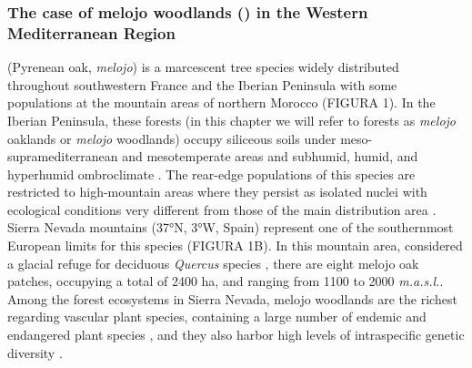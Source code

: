 \subsubsection{The case of melojo woodlands (\Qpy) in the Western Mediterranean Region}\label{sec:es:intro-qp}
\Qpw (Pyrenean oak, \emph{melojo}) is a marcescent tree species widely distributed throughout southwestern France and the Iberian Peninsula with some populations at the mountain areas of northern Morocco \autocites{Franco1990Quercus} (FIGURA 1). In the Iberian Peninsula, these forests (in this chapter we will refer to \Qpy forests as \emph{melojo} oaklands or \emph{melojo} woodlands) occupy siliceous soils under meso-supramediterranean and mesotemperate areas and subhumid, humid, and hyperhumid ombroclimate \autocites{delaSernaetal2016MarcescentQuercus,Gavilanetal2018SclerophyllousDeciduous}. The rear-edge populations of this species are restricted to high-mountain areas where they persist as isolated nuclei with ecological conditions very different from those of the main distribution area \autocites{PerezLuqueetal2021EcologicalDiversity}. Sierra Nevada mountains (37°N, 3°W, Spain) represent one of the southernmost European limits for this species (FIGURA 1B). In this mountain area, considered a glacial refuge for deciduous \emph{Quercus} species \autocite{Olaldeetal2002WhiteOaks}, there are eight melojo oak patches, occupying a total of 2400 ha, and ranging from 1100 to 2000 \emph{m.a.s.l.}. Among the forest ecosystems in Sierra Nevada, melojo woodlands are the richest regarding vascular plant species, containing a large number of endemic and endangered plant species \autocite{Loriteetal2008PhytosociologicalReview}, and they also harbor high levels of intraspecific genetic diversity  \autocite{ValbuenaCarabanaGil2013GeneticResilience,ValbuenaCarabanaGil2017CentenaryCoppicing}. 


